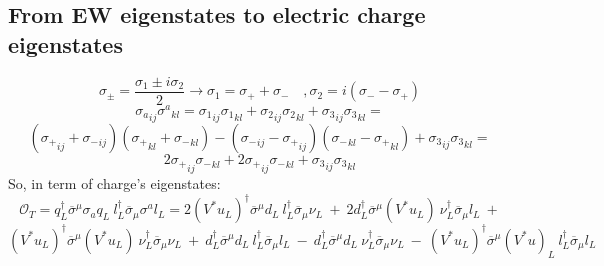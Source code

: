 \documentclass{article}
\begin{document}
\subsection{From EW eigenstates to electric charge eigenstates}
\[
\sigma_\pm = \frac{\sigma_1 \pm i \sigma_2}{2} \rightarrow \sigma_1 = \sigma_+ + \sigma_- \quad , \sigma_2 = i(\sigma_- - \sigma_+ ) 
\]
\[
{\sigma_a}_{ij} {\sigma^a}_{kl} = {\sigma_1}_{ij} {\sigma_1}_{kl} +{\sigma_2}_{ij} {\sigma_2}_{kl} + {\sigma_3}_{ij} {\sigma_3}_{kl} =
\]
\[
({\sigma_+}_{ij} + {\sigma_-}_{ij}) ({\sigma_+}_{kl} + {\sigma_-}_{kl}) -({\sigma_-}_{ij} - {\sigma_+}_{ij}) ({\sigma_-}_{kl}- {\sigma_+}_{kl}) + {\sigma_3}_{ij} {\sigma_3}_{kl}=
\]
\[
2{\sigma_+}_{ij} {\sigma_-}_{kl} + 2 {\sigma_+}_{ij} {\sigma_-}_{kl} + {\sigma_3}_{ij} {\sigma_3}_{kl}
\]
So, in term of charge's eigenstates:
\[
\mathcal{O}_T=q_L^\dagger \overline{\sigma}^\mu  \sigma_a q_L \ l_L^\dagger \overline{\sigma}_\mu \sigma^a l_L= 2 (V^* u_L)^\dagger \overline{\sigma}^\mu   d_L \ l_L^\dagger \overline{\sigma}_\mu \nu_L
 \ + \ 2 d_L^\dagger \overline{\sigma}^\mu  (V^* u_L) \ \nu_L^\dagger \overline{\sigma}_\mu  l_L
\ + 
 \]
 \[
 (V^* u_L)^\dagger \overline{\sigma}^\mu  (V^* u_L) \ \nu_L^\dagger \overline{\sigma}_\mu  \nu_L \ + \ d_L^\dagger \overline{\sigma}^\mu  d_L \ l_L^\dagger \overline{\sigma}_\mu  l_L \  - \ d_L^\dagger \overline{\sigma}^\mu   d_L \ \nu_L^\dagger \overline{\sigma}_\mu  \nu_L \ - \ (V^* u_L)^\dagger \overline{\sigma}^\mu (V^* u)_L \ l_L^\dagger \overline{\sigma}_\mu  l_L
 \] 
\end{document}
